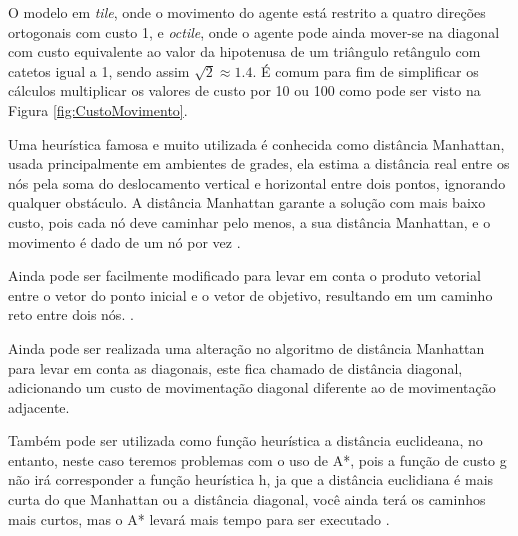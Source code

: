 O modelo em \textit{tile}, onde o movimento do agente está restrito a quatro direções ortogonais com custo 1, e \textit{octile}, onde o agente pode ainda mover-se na diagonal com custo equivalente ao valor da hipotenusa de um triângulo retângulo com catetos igual a 1, sendo assim  $ \sqrt{2}  \approx 1.4 $. É comum para fim de simplificar os cálculos multiplicar os valores de custo por 10 ou 100 como pode ser visto na Figura \ref{fig:CustoMovimento}.

\begin{minipage}{\linewidth}
    \label{fig:CustoMovimento}
\end{minipage}

Uma heurística famosa e muito utilizada é conhecida como distância Manhattan, usada principalmente em ambientes de grades, ela estima a distância real entre os nós pela soma do deslocamento vertical e horizontal entre dois pontos, ignorando qualquer obstáculo.
A distância Manhattan garante a solução com mais baixo custo, pois cada nó deve caminhar pelo menos, a sua distância Manhattan, e o movimento é dado de um nó por vez \cite{Korf2000}.

Ainda pode ser facilmente modificado para levar em conta o produto vetorial entre o vetor do ponto inicial e o vetor de objetivo, resultando em um caminho reto entre dois nós. \cite{GameProgrammingHeuristics}.

Ainda pode ser realizada uma alteração no algoritmo de distância Manhattan para levar em conta as diagonais, este fica chamado de distância diagonal, adicionando um custo de movimentação diagonal diferente ao de movimentação adjacente.

Também pode ser utilizada como função heurística a distância euclideana, no entanto, neste caso teremos problemas com o uso de A*, pois a função de custo g não irá corresponder a função heurística h, ja que a  distância euclidiana é mais curta do que Manhattan ou a distância diagonal, você ainda terá os caminhos mais curtos, mas o A* levará mais tempo para ser executado \cite{GameProgrammingHeuristics}.

